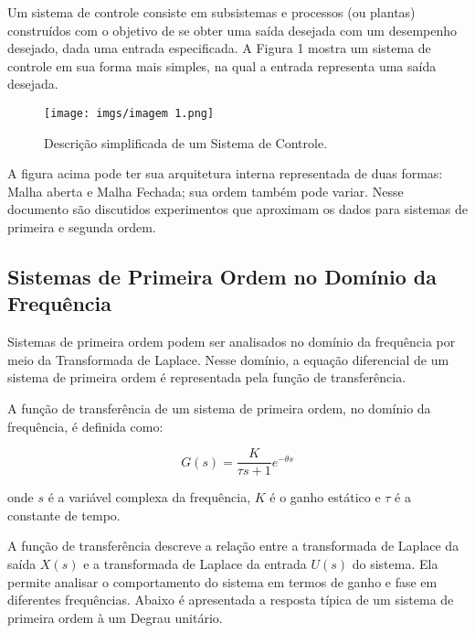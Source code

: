 \documentclass[a4paper,12pt]{article}
\begin{document}
    Um sistema de controle consiste em subsistemas e processos (ou plantas) construídos com o
    objetivo de se obter uma saída desejada com um desempenho desejado, dada uma entrada
    especificada. A Figura 1 mostra um sistema de controle em sua forma mais simples, na qual a
    entrada representa uma saída desejada.

    \begin{figure}[h]
        \centering
        \texttt{[image: imgs/imagem 1.png]}\\
        \caption{Descrição simplificada de um Sistema de Controle.}
        \label{fig:1}
    \end{figure}

    A figura acima pode ter sua arquitetura interna representada de duas formas: Malha aberta e Malha Fechada; sua ordem também pode variar. Nesse documento são discutidos experimentos que aproximam os dados para sistemas de primeira e segunda ordem.

    \subsection{Sistemas de Primeira Ordem no Domínio da Frequência}
    Sistemas de primeira ordem podem ser analisados no domínio da frequência por meio da Transformada de Laplace. Nesse domínio, a equação diferencial de um sistema de primeira ordem é representada pela função de transferência.

    A função de transferência de um sistema de primeira ordem, no domínio da frequência, é definida como:

    \begin{equation*}
    G(s) = \frac{K}{\tau s + 1} e^{-\theta s} \tag{2.2.1}
    \end{equation*}
    
    onde \(s\) é a variável complexa da frequência, \(K\) é o ganho estático e \(\tau\) é a constante de tempo.
    
    A função de transferência descreve a relação entre a transformada de Laplace da saída \(X(s)\) e a transformada de Laplace da entrada \(U(s)\) do sistema. Ela permite analisar o comportamento do sistema em termos de ganho e fase em diferentes frequências. Abaixo é apresentada a resposta típica de um sistema de primeira ordem à um Degrau unitário. 
    
\end{document}
